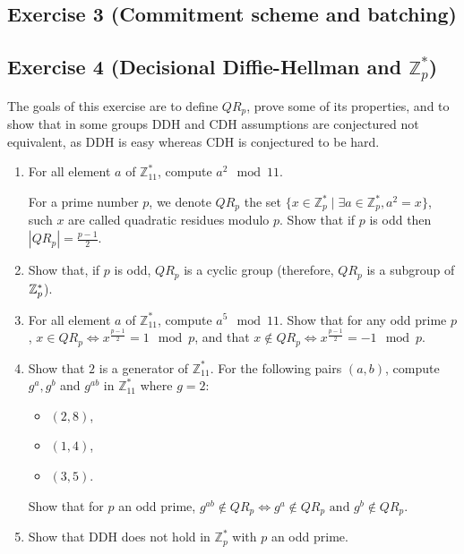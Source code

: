 \subsection{Exercise 3 (Commitment scheme and batching)}




\subsection{Exercise 4 (Decisional Diffie-Hellman and \texorpdfstring{$\mathbb{Z}_p^\ast$}{Zp*})}

The goals of this exercise are to define $QR_p$, prove some of its properties, and to show that in some groups DDH and CDH assumptions are conjectured not equivalent, as DDH is easy whereas CDH is conjectured to be hard.

\begin{enumerate}
	\item For all element $a$ of $\mathbb{Z}_{11}^*$, compute $a^2 \mod 11$.

	For a prime number $p$, we denote $QR_p$ the set $\{x \in \mathbb{Z}_{p}^* \; | \; \exists a\in \mathbb{Z}_{p}^*, a^2=x\}$, such $x$ are called quadratic residues modulo $p$. Show that if $p$ is odd then $|QR_p|=\frac{p-1}{2}$.

	\item Show that, if $p$ is odd, $QR_p$ is a cyclic group (therefore, $QR_p$ is a subgroup of $\mathbb{Z}^*_p$).

	\item For all element $a$ of $\mathbb{Z}_{11}^*$, compute $a^5 \mod 11$. Show that for any odd prime $p$, $x \in QR_p \Leftrightarrow x^{\frac{p-1}{2}}= 1 \mod p$, and that $x \not \in QR_p \Leftrightarrow x^{\frac{p-1}{2}}= -1 \mod p$.

	\item Show that $2$ is a generator of $\mathbb{Z}_{11}^*$. For the following pairs $(a,b)$, compute $g^a, g^b$ and $g^{ab}$ in $\mathbb{Z}_{11}^*$ where $g=2$:
	\begin{itemize}
		\item $(2,8)$,
		\item $(1,4)$,
		\item $(3,5)$.
	\end{itemize}
	Show that for $p$ an odd prime, $g^{ab} \not \in QR_p \Leftrightarrow g^a \not \in QR_p \text{ and } g^b \not \in QR_p$.

	\item Show that DDH does not hold in $\mathbb{Z}_{p}^*$ with $p$ an odd prime.
\end{enumerate}


